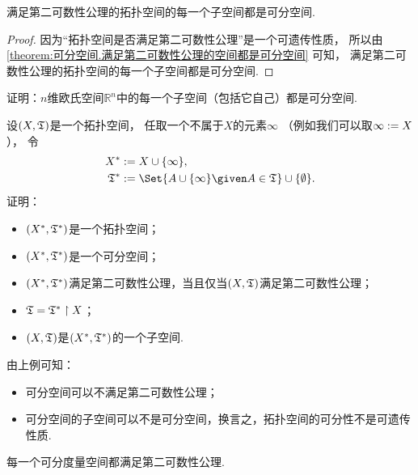 \begin{corollary}
满足第二可数性公理的拓扑空间的每一个子空间都是可分空间.
\begin{proof}
因为“拓扑空间是否满足第二可数性公理”是一个可遗传性质，
所以由\cref{theorem:可分空间.满足第二可数性公理的空间都是可分空间} 可知，
满足第二可数性公理的拓扑空间的每一个子空间都是可分空间.
\end{proof}
\end{corollary}

\begin{example}
证明：\(n\)维欧氏空间\(\mathbb{R}^n\)中的每一个子空间（包括它自己）都是可分空间.
\end{example}

\begin{example}
设\((X,{\mathfrak T})\)是一个拓扑空间，
任取一个不属于\(X\)的元素\(\infty\)
（例如我们可以取\(\infty := X\)），
令\begin{align*}
	X^* &\defeq X \cup \{\infty\}, \\
	\T^* &\defeq \Set{
		A \cup \{\infty\}
		\given
		A \in \T
	} \cup \{\emptyset\}.
\end{align*}
证明：\begin{itemize}
	\item \((X^*,{\mathfrak T}^*)\)是一个拓扑空间；
	\item \((X^*,{\mathfrak T}^*)\)是一个可分空间；
	\item \((X^*,{\mathfrak T}^*)\)满足第二可数性公理，当且仅当\((X,{\mathfrak T})\)满足第二可数性公理；
	\item \({\mathfrak T} = {\mathfrak T}^* \upharpoonright X\)；
	\item \((X,{\mathfrak T})\)是\((X^*,{\mathfrak T}^*)\)的一个子空间.
\end{itemize}
\end{example}
\begin{remark}
由上例可知：\begin{itemize}
	\item 可分空间可以不满足第二可数性公理；
	\item 可分空间的子空间可以不是可分空间，换言之，拓扑空间的可分性不是可遗传性质.
\end{itemize}
\end{remark}

\begin{theorem}
每一个可分度量空间都满足第二可数性公理.
\end{theorem}

